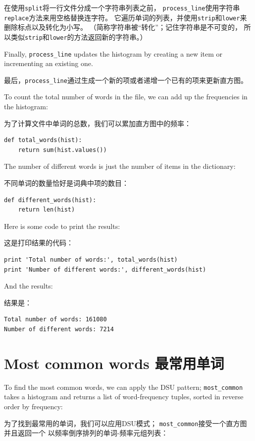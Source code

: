 \documentclass[10pt]{book}
\begin{document}
\begin{CJK}{UTF8}{gbsn}
在使用{\tt split}将一行文件分成一个字符串列表之前，
\verb"process_line"使用字符串{\tt replace}方法来用空格替换连字符。
它遍历单词的列表，并使用{\tt strip}和{\tt lower}来删除标点以及转化为小写。
（简称字符串被``转化''；记住字符串是不可变的，
所以类似{\tt strip}和{\tt lower}的方法返回新的字符串。）

Finally, \verb"process_line" updates the histogram by creating a new
item or incrementing an existing one.

最后，\verb"process_line"通过生成一个新的项或者递增一个已有的项来更新直方图。

To count the total number of words in the file, we can add up
the frequencies in the histogram:

为了计算文件中单词的总数，我们可以累加直方图中的频率：

\begin{verbatim}
def total_words(hist):
    return sum(hist.values())
\end{verbatim}
%
The number of different words is just the number of items in
the dictionary:

不同单词的数量恰好是词典中项的数目：

\begin{verbatim}
def different_words(hist):
    return len(hist)
\end{verbatim}
%
Here is some code to print the results:

这是打印结果的代码：

\begin{verbatim}
print 'Total number of words:', total_words(hist)
print 'Number of different words:', different_words(hist)
\end{verbatim}
%
And the results:

结果是：

\begin{verbatim}
Total number of words: 161080
Number of different words: 7214
\end{verbatim}
%

\section{Most common words 最常用单词}

To find the most common words, we can apply the DSU pattern;
\verb"most_common" takes a histogram and returns a list of
word-frequency tuples, sorted in reverse order by frequency:

为了找到最常用的单词，我们可以应用DSU模式；
\verb"most_common"接受一个直方图并且返回一个
以频率倒序排列的单词-频率元组列表：


\end{CJK}
\end{document}
